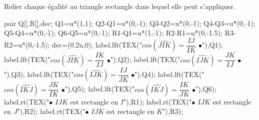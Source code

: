 \begin{exercice*}
    Relier chaque égalité au triangle rectangle dans \mbox{lequel} elle peut s'appliquer.
    \begin{center}
        \begin{Geometrie}[CoinBG={(-2u,-5u)}]
            pair Q[],R[],dec;
            Q1=u*(1,1);
            Q2-Q1=u*(0,-1);
            Q3-Q2=u*(0,-1);
            Q4-Q3=u*(0,-1);
            Q5-Q4=u*(0,-1);
            Q6-Q5=u*(0,-1);
            R1-Q1=u*(1,-1);
            R2-R1=u*(0,-1.5);
            R3-R2=u*(0,-1.5);
            dec=(0.2u,0);
            label.lft(TEX("$cos(\widehat{JIK})=\dfrac{IJ}{IK}$ $\bullet$"),Q1);
            label.lft(TEX("$cos(\widehat{JIK})=\dfrac{IK}{IJ}$ $\bullet$"),Q2);
            label.lft(TEX("$cos(\widehat{IJK})=\dfrac{JK}{IJ}$ $\bullet$"),Q3);
            label.lft(TEX("$cos(\widehat{IJK})=\dfrac{IJ}{JK}$ $\bullet$"),Q4);
            label.lft(TEX("$cos(\widehat{IKJ})=\dfrac{JK}{IK}$ $\bullet$"),Q5);
            label.lft(TEX("$cos(\widehat{IKJ})=\dfrac{IK}{JK}$ $\bullet$"),Q6);
            label.rt(TEX("$\bullet$ $IJK$ est rectangle en $I$"),R1);
            label.rt(TEX("$\bullet$ $IJK$ est rectangle en $J$"),R2);
            label.rt(TEX("$\bullet$ $IJK$ est rectangle en $K$"),R3);
        \end{Geometrie}
    \end{center}
\end{exercice*}
